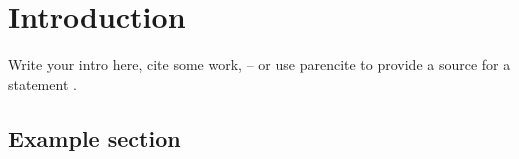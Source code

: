 \chapter{Introduction}
\label{cha:introduction}

Write your intro here, cite some work, \eg{} \textcite{kohn-menzel-2014-incremental} – or
use parencite to provide a source for a statement \parencite{kohn-etal-2020-mc}.

\section{Example section}
\label{sec:example-section}

